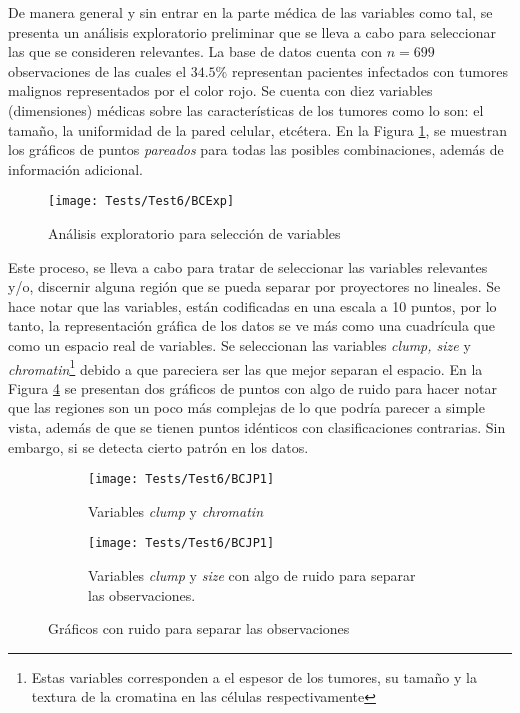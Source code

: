 De manera general y sin entrar en la parte médica de las variables como tal, se presenta un análisis exploratorio preliminar que se lleva a cabo para seleccionar las que se consideren relevantes. La base de datos cuenta con $n = 699$ observaciones de las cuales el $34.5\%$ representan pacientes infectados con tumores malignos representados por el color rojo. Se cuenta con diez variables (dimensiones) médicas sobre las características de los tumores como lo son: el tamaño, la uniformidad de la pared celular, etcétera. En la Figura \ref{fig:BCExp}, se muestran los gráficos de puntos \textit{pareados} para todas las posibles combinaciones, además de información adicional.
\begin{figure}[h]
	\centering
	\texttt{[image: Tests/Test6/BCExp]}
	\caption{Análisis exploratorio para selección de variables}
	\label{fig:BCExp}
\end{figure}
Este proceso, se lleva a cabo para tratar de seleccionar las variables relevantes y/o, discernir alguna región que se pueda separar por proyectores no lineales. Se hace notar que las variables, están codificadas en una escala a 10 puntos, por lo tanto, la representación gráfica de los datos se ve más como una cuadrícula que como un espacio real de variables. Se seleccionan las variables \textit{clump, size} y \textit{chromatin}\footnote{Estas variables corresponden a el espesor de los tumores, su tamaño y la textura de la cromatina en las células respectivamente} debido a que pareciera ser las que mejor separan el espacio. En la Figura \ref{fig:BCJP} se presentan dos gráficos de puntos con algo de ruido para hacer notar que las regiones son un poco más complejas de lo que podría parecer a simple vista, además de que se tienen puntos idénticos con clasificaciones contrarias. Sin embargo, si se detecta cierto patrón en los datos.
\begin{figure}[h]
        \centering
        \begin{subfigure}[b]{0.45\textwidth}
            \centering
            \texttt{[image: Tests/Test6/BCJP1]}
            \caption{Variables \textit{clump} y \textit{chromatin}}
			\label{fig:BCJP1}
        \end{subfigure}
        \hfill
        \begin{subfigure}[b]{0.45\textwidth}  
            \centering 
            \texttt{[image: Tests/Test6/BCJP1]}
            \caption{Variables \textit{clump} y \textit{size} con algo de ruido para separar las observaciones.}
			\label{fig:BCJP2}
        \end{subfigure}
		\caption{Gráficos con  ruido para separar las observaciones}
		\label{fig:BCJP}
\end{figure}

